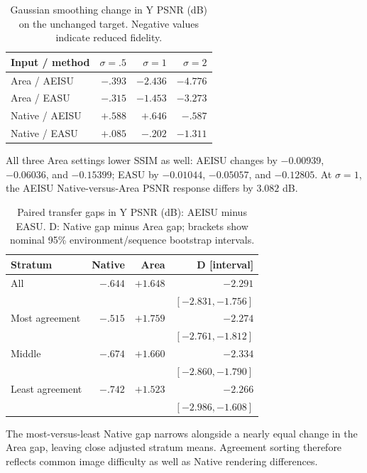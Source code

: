\documentclass[10pt,twocolumn,letterpaper]{article}
\begin{document}
\begin{table}[t]
\centering\footnotesize
\caption{Gaussian smoothing change in Y PSNR (dB) on the unchanged target. Negative values indicate reduced fidelity.}
\label{tab:area-blur-control}
\begin{tabularx}{\columnwidth}{Yrrr}
\toprule
Input / method & $\sigma=.5$ & $\sigma=1$ & $\sigma=2$\\
\midrule
Area / AEISU & $-.393$ & $-2.436$ & $-4.776$\\
Area / EASU & $-.315$ & $-1.453$ & $-3.273$\\
Native / AEISU & $+.588$ & $+.646$ & $-.587$\\
Native / EASU & $+.085$ & $-.202$ & $-1.311$\\
\bottomrule
\end{tabularx}
\end{table}

All three Area settings lower SSIM as well: AEISU changes by $-0.00939$, $-0.06036$, and $-0.15399$; EASU by $-0.01044$, $-0.05057$, and $-0.12805$.
At $\sigma=1$, the AEISU Native-versus-Area PSNR response differs by $3.082$ dB.

\begin{table}[t]
\centering\footnotesize
\caption{Paired transfer gaps in Y PSNR (dB): AEISU minus EASU. D: Native gap minus Area gap; brackets show nominal 95\% environment/sequence bootstrap intervals.}
\label{tab:paired-transfer-gap}
\begin{tabularx}{\columnwidth}{Yrrr}
\toprule
Stratum & Native & Area & D [interval]\\
\midrule
All & $-.644$ & $+1.648$ & $-2.291$\\
 & & & $[-2.831,-1.756]$\\
Most agreement & $-.515$ & $+1.759$ & $-2.274$\\
 & & & $[-2.761,-1.812]$\\
Middle & $-.674$ & $+1.660$ & $-2.334$\\
 & & & $[-2.860,-1.790]$\\
Least agreement & $-.742$ & $+1.523$ & $-2.266$\\
 & & & $[-2.986,-1.608]$\\
\bottomrule
\end{tabularx}
\end{table}

The most-versus-least Native gap narrows alongside a nearly equal change in the Area gap, leaving close adjusted stratum means.
Agreement sorting therefore reflects common image difficulty as well as Native rendering differences.
\end{document}
